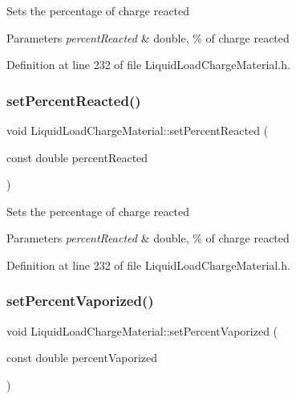 Sets the percentage of charge reacted 
\begin{DoxyParams}{Parameters}
{\em percent\+Reacted} & double, \% of charge reacted \\
\hline
\end{DoxyParams}


Definition at line 232 of file Liquid\+Load\+Charge\+Material.\+h.

\mbox{\label{class_liquid_load_charge_material_a9984b8c78a460ef3569fc3ef13eea604}} 
\subsubsection{\texorpdfstring{set\+Percent\+Reacted()}{setPercentReacted()}\hspace{0.1cm}{\footnotesize\ttfamily [3/3]}}
{\footnotesize\ttfamily void Liquid\+Load\+Charge\+Material\+::set\+Percent\+Reacted (\begin{DoxyParamCaption}\item[{const double}]{percent\+Reacted }\end{DoxyParamCaption})\hspace{0.3cm}{\ttfamily [inline]}}

Sets the percentage of charge reacted 
\begin{DoxyParams}{Parameters}
{\em percent\+Reacted} & double, \% of charge reacted \\
\hline
\end{DoxyParams}


Definition at line 232 of file Liquid\+Load\+Charge\+Material.\+h.

\mbox{\label{class_liquid_load_charge_material_aaf2aa3303201370a7b79e5b3f54e135a}} 
\subsubsection{\texorpdfstring{set\+Percent\+Vaporized()}{setPercentVaporized()}\hspace{0.1cm}{\footnotesize\ttfamily [1/3]}}
{\footnotesize\ttfamily void Liquid\+Load\+Charge\+Material\+::set\+Percent\+Vaporized (\begin{DoxyParamCaption}\item[{const double}]{percent\+Vaporized }\end{DoxyParamCaption})\hspace{0.3cm}{\ttfamily [inline]}}

